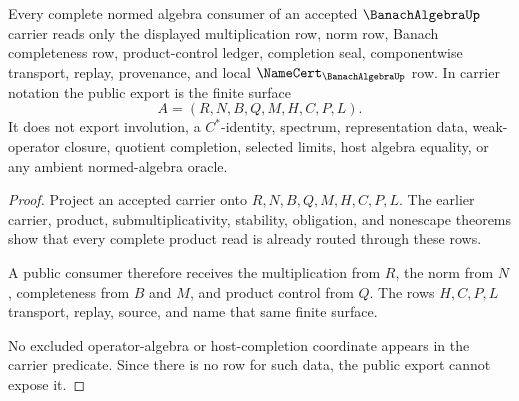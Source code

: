 \begin{theorem}
\label{thm:banach-algebra-public-export-surface}
Every complete normed algebra consumer of an accepted $\BanachAlgebraUp$ carrier reads only the displayed multiplication row, norm row, Banach completeness row, product-control ledger, completion seal, componentwise transport, replay, provenance, and local $\NameCert_{\BanachAlgebraUp}$ row. In carrier notation the public export is the finite surface
$$
A=(R,N,B,Q,M,H,C,P,L).
$$
It does not export involution, a $C^*$-identity, spectrum, representation data, weak-operator closure, quotient completion, selected limits, host algebra equality, or any ambient normed-algebra oracle.
\end{theorem}
\begin{proof}
Project an accepted carrier onto $R,N,B,Q,M,H,C,P,L$. The earlier carrier, product, submultiplicativity, stability, obligation, and nonescape theorems show that every complete product read is already routed through these rows.

A public consumer therefore receives the multiplication from $R$, the norm from $N$, completeness from $B$ and $M$, and product control from $Q$. The rows $H,C,P,L$ transport, replay, source, and name that same finite surface.

No excluded operator-algebra or host-completion coordinate appears in the carrier predicate. Since there is no row for such data, the public export cannot expose it.
\end{proof}

